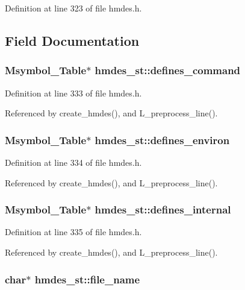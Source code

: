 Definition at line 323 of file hmdes.h.

\subsection{Field Documentation}
\subsubsection{\setlength{\rightskip}{0pt plus 5cm}\bf{Msymbol\_\-Table}$\ast$ \bf{hmdes\_\-st::defines\_\-command}}\label{structhmdes__st_f97889ead3712c69d16c0b3065751a22}




Definition at line 333 of file hmdes.h.

Referenced by create\_\-hmdes(), and L\_\-preprocess\_\-line().
\subsubsection{\setlength{\rightskip}{0pt plus 5cm}\bf{Msymbol\_\-Table}$\ast$ \bf{hmdes\_\-st::defines\_\-environ}}\label{structhmdes__st_e49c39adcba261565e40c60a1ce6b4ee}




Definition at line 334 of file hmdes.h.

Referenced by create\_\-hmdes(), and L\_\-preprocess\_\-line().
\subsubsection{\setlength{\rightskip}{0pt plus 5cm}\bf{Msymbol\_\-Table}$\ast$ \bf{hmdes\_\-st::defines\_\-internal}}\label{structhmdes__st_dbef010eddb133b0624cbd7bb2028ae5}




Definition at line 335 of file hmdes.h.

Referenced by create\_\-hmdes(), and L\_\-preprocess\_\-line().
\subsubsection{\setlength{\rightskip}{0pt plus 5cm}char$\ast$ \bf{hmdes\_\-st::file\_\-name}}\label{structhmdes__st_fd1dc8fab430ab25be10960c41fe6c13}




